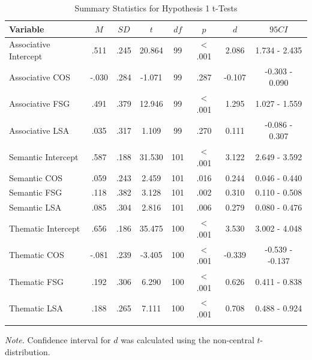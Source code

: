 \documentclass[english,man]{apa6}
\theoremstyle{definition}
\theoremstyle{definition}
\theoremstyle{remark}
\begin{document}
\begin{table}[tbp]
\begin{center}
\begin{threeparttable}
\caption{\label{tab:hyp1-table1}Summary Statistics for Hypothesis 1 t-Tests}
\begin{tabular}{lccccccc}
\toprule
Variable & \multicolumn{1}{c}{$M$} & \multicolumn{1}{c}{$SD$} & \multicolumn{1}{c}{$t$} & \multicolumn{1}{c}{$df$} & \multicolumn{1}{c}{$p$} & \multicolumn{1}{c}{$d$} & \multicolumn{1}{c}{$95 CI$}\\
\midrule
Associative Intercept & .511 & .245 & 20.864 & 99 & < .001 & 2.086 & 1.734 - 2.435\\
Associative COS & -.030 & .284 & -1.071 & 99 & .287 & -0.107 & -0.303 - 0.090\\
Associative FSG & .491 & .379 & 12.946 & 99 & < .001 & 1.295 & 1.027 - 1.559\\
Associative LSA & .035 & .317 & 1.109 & 99 & .270 & 0.111 & -0.086 - 0.307\\
Semantic Intercept & .587 & .188 & 31.530 & 101 & < .001 & 3.122 & 2.649 - 3.592\\
Semantic COS & .059 & .243 & 2.459 & 101 & .016 & 0.244 & 0.046 - 0.440\\
Semantic FSG & .118 & .382 & 3.128 & 101 & .002 & 0.310 & 0.110 - 0.508\\
Semantic LSA & .085 & .304 & 2.816 & 101 & .006 & 0.279 & 0.080 - 0.476\\
Thematic Intercept & .656 & .186 & 35.475 & 100 & < .001 & 3.530 & 3.002 - 4.048\\
Thematic COS & -.081 & .239 & -3.405 & 100 & < .001 & -0.339 & -0.539 - -0.137\\
Thematic FSG & .192 & .306 & 6.290 & 100 & < .001 & 0.626 & 0.411 - 0.838\\
Thematic LSA & .188 & .265 & 7.111 & 100 & < .001 & 0.708 & 0.488 - 0.924\\
\bottomrule
\addlinespace
\end{tabular}
\begin{tablenotes}[para]
\textit{Note.} Confidence interval for $d$ was calculated using the non-central $t$-distribution. 
\end{tablenotes}
\end{threeparttable}
\end{center}
\end{table}
\end{document}
